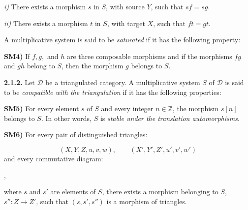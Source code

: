 \clearpage
{}%
\begingroup
\small
\setlength{\emergencystretch}{1.5em}%
\setlength{\abovedisplayskip}{3pt plus 2pt minus 2pt}%
\setlength{\belowdisplayskip}{3pt plus 2pt minus 2pt}%

\noindent\textit{i)} There exists a morphism $s$ in $S$, with source $Y$,
such that $sf=sg$.

\noindent\textit{ii)} There exists a morphism $t$ in $S$, with target $X$,
such that $ft=gt$.

\noindent A multiplicative system is said to be \emph{saturated} if it has the
following property:

\smallskip
\noindent\textbf{SM4)} If $f,g,$ and $h$ are three composable morphisms and if
the morphisms $fg$ and $gh$ belong to $S$, then the morphism $g$ belongs to
$S$.

\medskip
\noindent\textbf{2.1.2.}\quad
{}
Let $\mathcal D$ be a triangulated category. A multiplicative system $S$ of
$\mathcal D$ is said to be \emph{compatible with the triangulation} if it has
the following properties:

\smallskip
\noindent\textbf{SM5)} For every element $s$ of $S$ and every integer
$n\in\mathbb Z$, the morphism $s[n]$ belongs to $S$. In other words, $S$ is
\emph{stable under the translation automorphisms}.

\smallskip
\noindent\textbf{SM6)} For every pair of distinguished triangles:

\[
  (X,Y,Z,u,v,w), \qquad (X',Y',Z',u',v',w')
\]
\noindent and every commutative diagram:

\begin{center}
  \quad ,
\end{center}
\noindent where $s$ and $s'$ are elements of $S$, there exists a morphism
belonging to $S$, $s''\colon Z\to Z'$, such that $(s,s',s'')$ is a morphism of
triangles.

